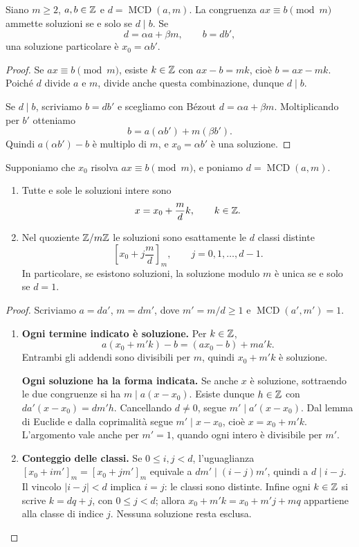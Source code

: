 \begin{teorema}\label{teo:congruenza-lineare}
Siano $m\ge2$, $a,b\in\mathbb{Z}$ e $d=\operatorname{MCD}(a,m)$. La congruenza $ax\equiv b\pmod m$ ammette soluzioni se e solo se $d\mid b$. Se
\[
d=\alpha a+\beta m,\qquad b=db',
\]
una soluzione particolare è $x_0=\alpha b'$.
\end{teorema}
\begin{proof}
\passomath{\Rightarrow} Se $ax\equiv b\pmod m$, esiste $k\in\mathbb{Z}$ con $ax-b=mk$, cioè $b=ax-mk$. Poiché $d$ divide $a$ e $m$, divide anche questa combinazione, dunque $d\mid b$.

\passomath{\Leftarrow} Se $d\mid b$, scriviamo $b=db'$ e scegliamo con Bézout $d=\alpha a+\beta m$. Moltiplicando per $b'$ otteniamo
\[
b=a(\alpha b')+m(\beta b').
\]
Quindi $a(\alpha b')-b$ è multiplo di $m$, e $x_0=\alpha b'$ è una soluzione.
\end{proof}

\begin{teorema}\label{teo:tutte-congruenza}
Supponiamo che $x_0$ risolva $ax\equiv b\pmod m$, e poniamo $d=\operatorname{MCD}(a,m)$. \begin{enumerate}[label=\arabic*.]
\item Tutte e sole le soluzioni intere sono
\[
x=x_0+\frac{m}{d}k,\qquad k\in\mathbb{Z}.
\]
\item Nel quoziente $\mathbb{Z}/m\mathbb{Z}$ le soluzioni sono esattamente le $d$ classi distinte
\[
\left[x_0+j\frac{m}{d}\right]_m,\qquad j=0,1,\ldots,d-1.
\]
In particolare, se esistono soluzioni, la soluzione modulo $m$ è unica se e solo se $d=1$.
\end{enumerate}
\end{teorema}
\begin{proof}
Scriviamo $a=da'$, $m=dm'$, dove $m'=m/d\ge1$ e $\operatorname{MCD}(a',m')=1$.

\begin{enumerate}[label=\arabic*.]
\item \textbf{Ogni termine indicato è soluzione.} Per $k\in\mathbb{Z}$,
\[
a(x_0+m'k)-b=(ax_0-b)+ma'k.
\]
Entrambi gli addendi sono divisibili per $m$, quindi $x_0+m'k$ è soluzione.

\textbf{Ogni soluzione ha la forma indicata.} Se anche $x$ è soluzione, sottraendo le due congruenze si ha $m\mid a(x-x_0)$. Esiste dunque $h\in\mathbb{Z}$ con $da'(x-x_0)=dm'h$. Cancellando $d\ne0$, segue $m'\mid a'(x-x_0)$. Dal lemma di Euclide e dalla coprimalità segue $m'\mid x-x_0$, cioè $x=x_0+m'k$. L'argomento vale anche per $m'=1$, quando ogni intero è divisibile per $m'$.
\item \textbf{Conteggio delle classi.} Se $0\le i,j<d$, l'uguaglianza $[x_0+im']_m=[x_0+jm']_m$ equivale a $dm'\mid(i-j)m'$, quindi a $d\mid i-j$. Il vincolo $|i-j|<d$ implica $i=j$: le classi sono distinte. Infine ogni $k\in\mathbb{Z}$ si scrive $k=dq+j$, con $0\le j<d$; allora $x_0+m'k=x_0+m'j+mq$ appartiene alla classe di indice $j$. Nessuna soluzione resta esclusa.
\end{enumerate}
\end{proof}

